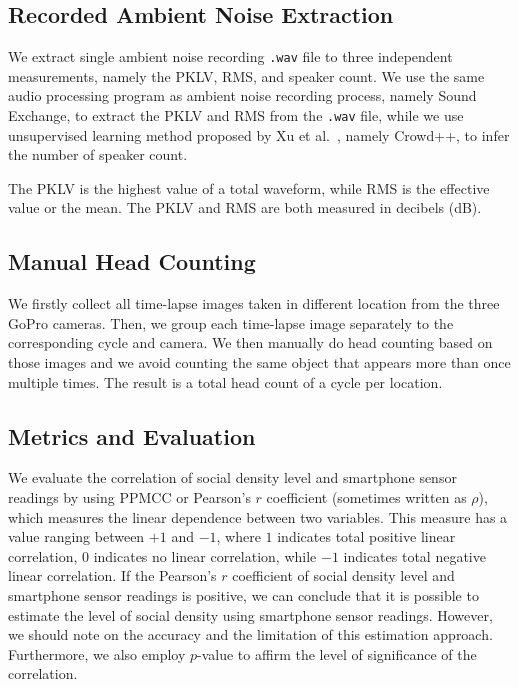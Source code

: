 \subsection{Recorded Ambient Noise Extraction} %
\label{sub:recorded_ambient_noise_extraction}
We extract single ambient noise recording \verb|.wav| file to three independent measurements, namely the \ac{PKLV}, \ac{RMS}, and speaker count. We use the same audio processing program as ambient noise recording process, namely Sound Exchange, to extract the \ac{PKLV} and \ac{RMS} from the \verb|.wav| file, while we use unsupervised learning method proposed by Xu et al.~\cite{thesis067}, namely Crowd++, to infer the number of speaker count.

The \ac{PKLV} is the highest value of a total waveform, while \ac{RMS} is the effective value or the mean. The \ac{PKLV} and \ac{RMS} are both measured in decibels (dB).

\subsection{Manual Head Counting} %
\label{sub:manual_head_counting}
We firstly collect all time-lapse images taken in different location from the three GoPro cameras. Then, we group each time-lapse image separately to the corresponding cycle and camera. We then manually do head counting based on those images and we avoid counting the same object that appears more than once multiple times. The result is a total head count of a cycle per location.
	
\subsection{Metrics and Evaluation} %
\label{sub:metrics-evaluation}
We evaluate the correlation of social density level and smartphone sensor readings by using \ac{PPMCC} or Pearson's $r$ coefficient (sometimes written as $\rho$), which measures the linear dependence between two variables. This measure has a value ranging between $+1$ and $-1$, where $1$ indicates total positive linear correlation, 0 indicates no linear correlation, while $-1$ indicates total negative linear correlation. If the Pearson's $r$ coefficient of social density level and smartphone sensor readings is positive, we can conclude that it is possible to estimate the level of social density using smartphone sensor readings. However, we should note on the accuracy and the limitation of this estimation approach. Furthermore, we also employ $p$-value to affirm the level of significance of the correlation.


